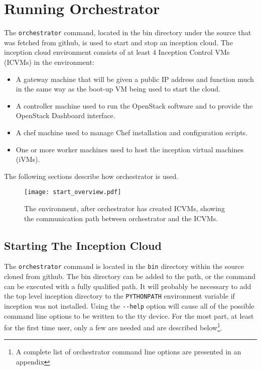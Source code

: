 \section{Running Orchestrator}
The \verb!orchestrator! command, located in the bin directory under the source that was fetched from github, 
is used to start and stop an inception cloud. 
The inception cloud environment consists of at least 4 Inception Control VMs (ICVMs)  in the environment:

\begin{itemize}
\item A gateway machine that will be given a public IP address and function much in the same way as the 
boot-up VM being used to start the cloud. 

\item A controller machine used to run the OpenStack software and to provide the OpenStack Dashboard interface. 

\item A chef machine used to manage Chef installation and configuration scripts. 

\item One or more worker machines used to host the inception virtual machines (iVMs). 
\end{itemize}

\noindent
The following sections describe how orchestrator is used. 

\begin{figure}
  \centering
  \texttt{[image: start\_overview.pdf]}
  \tiny
  \caption{\small The environment, after orchestrator has created ICVMs, showing the communication path between orchestrator and the ICVMs.
    \label{fg_overview} \normalsize
  }
  \normalsize
\end{figure}

\subsection{Starting The Inception Cloud}
The \verb!orchestrator! command is located in the \verb!bin! directory within the source cloned from github. 
The bin directory can be added to the path, or the command can be executed with a fully qualified path.  
It will probably be necessary to add the top level inception directory to the \verb!PYTHONPATH! environment variable
if inception was not installed. 
Using the \verb!--help! option will cause all of the possible command line options to be written to the tty device. 
For the most part, at least for the first time user, only a few are needed and are described 
below\footnote{A complete list of orchestrator command line options are presented in an appendix}. 

